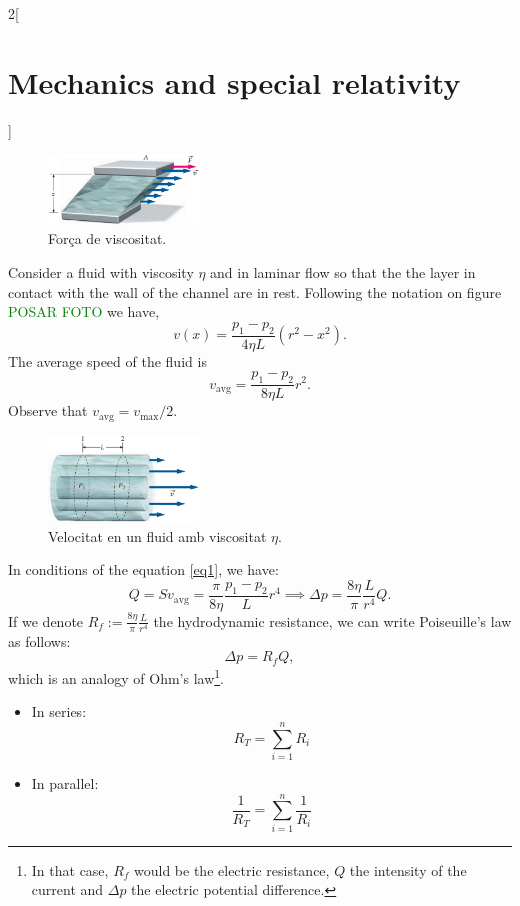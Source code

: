\documentclass[class=article,10pt,crop=false]{standalone}
\begin{document}
\begin{multicols}{2}[\section{Mechanics and special relativity}]
\begin{concept}[Viscosity]
\end{concept}
\begin{figure}[ht]
    \centering
    \includegraphics[width=4cm]{Physics/1st/Mechanics_and_special_relativity/Images/vis.jpg}
    \caption{Força de viscositat.}
\end{figure}
\begin{concept}
Consider a fluid with viscosity $\eta$ and in laminar flow so that the the layer in contact with the wall of the channel are in rest. Following the notation on figure \textcolor{green}{POSAR FOTO} we have,
$$v(x)=\frac{p_1-p_2}{4\eta L}(r^2-x^2).$$ The average speed of the fluid is 
\begin{equation}
    v_\text{avg}=\frac{p_1-p_2}{8\eta L}r^2.
    \label{eq1}
\end{equation} Observe that $v_\text{avg}=v_\text{max}/2$.
\end{concept}
\begin{figure}[ht]
    \centering
    \includegraphics[width=4cm]{Physics/1st/Mechanics_and_special_relativity/Images/vis2.jpg}
    \caption{Velocitat en un fluid amb viscositat $\eta$.}
\end{figure}
\begin{concept}
In conditions of the equation \eqref{eq1}, we have: $$Q=Sv_\text{avg}=\frac{\pi}{8\eta }\frac{p_1-p_2}{L}r^4\implies\Delta p=\frac{8\eta}{\pi}\frac{L}{r^4}Q.$$ If we denote $\displaystyle R_f:=\frac{8\eta}{\pi}\frac{L}{r^4}$ the hydrodynamic resistance, we can write Poiseuille's law as follows: $$\Delta p=R_f Q,$$ which is an analogy of Ohm's law\footnote{In that case, $R_f$ would be the electric resistance, $Q$ the intensity of the current and $\Delta p$ the electric potential difference.}.
\end{concept}
\begin{concept}
\hfill\begin{itemize}
    \item In series: $$R_T=\sum_{i=1}^nR_i$$
    \item In parallel: $$\frac{1}{R_T}=\sum_{i=1}^n\frac{1}{R_i}$$

\end{itemize}
\end{concept}
\end{multicols}
\end{document}
